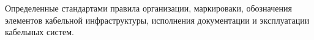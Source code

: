 Определенные стандартами правила организации,
маркироваки, обозначения элементов кабельной
инфраструктуры, исполнения документации и
эксплуатации кабельных систем.